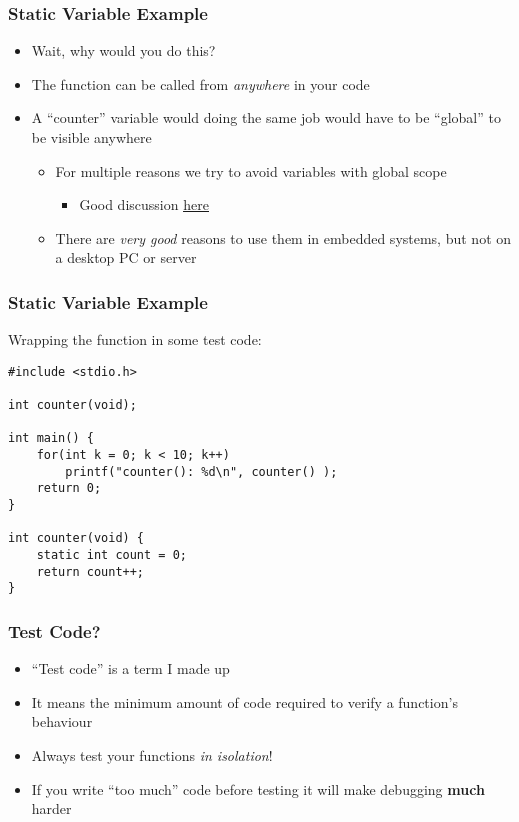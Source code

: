 \documentclass[14pt]{beamer}
\begin{document}
\begin{frame}
\frametitle{Static Variable Example}
\begin{itemize}
\item Wait, why would you do this?
\pause
\item The function can be called from \textit{anywhere} in your code
\pause
\item A ``counter'' variable would doing the same job would have to be ``global'' to be visible anywhere
	\begin{itemize}
\pause
		\item For multiple reasons we try to avoid variables with global scope
			\begin{itemize}
				\item Good discussion \underline{\href{http://wiki.c2.com/?GlobalVariablesAreBad}{here}}
			\end{itemize}
\pause
		\item There are \textit{very good} reasons to use them in embedded systems, but not on a desktop PC or server
	\end{itemize}
\end{itemize}
\end{frame}

\begin{frame}[fragile]
\frametitle{Static Variable Example}
Wrapping the function in some test code:
\begin{lstlisting}[style=CStyle]
#include <stdio.h>

int counter(void);

int main() {
	for(int k = 0; k < 10; k++)
		printf("counter(): %d\n", counter() );
	return 0;
}

int counter(void) {
	static int count = 0;
	return count++;
}
\end{lstlisting}
\end{frame}

\begin{frame}
\frametitle{Test Code?}
\begin{itemize}
\item ``Test code'' is a term I made up
\item It means the minimum amount of code required to verify a function's behaviour
\item Always test your functions \textit{in isolation}!
\pause
\item If you write ``too much'' code before testing it will make debugging \textbf{much} harder
\end{itemize}
\end{frame}
\end{document}
